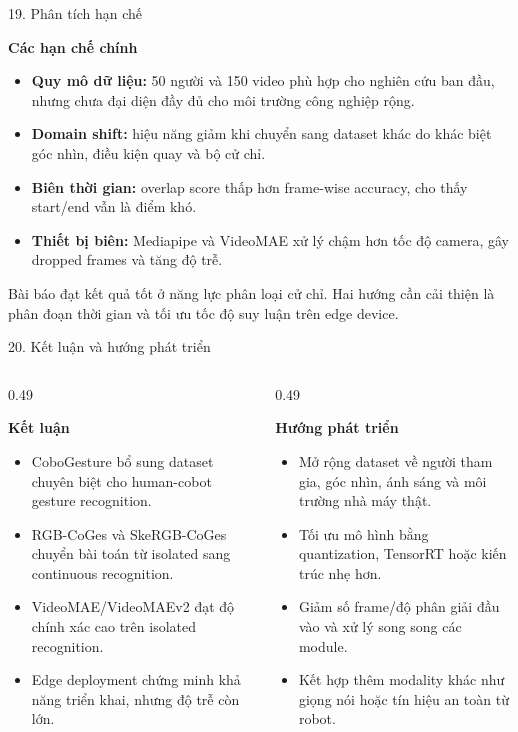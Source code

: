 \documentclass[aspectratio=169,9pt]{beamer}
\newcommand{\heading}[1]{{\bfseries #1\par}}
\newcommand{\tightitems}{\setlength{\itemsep}{0.12em}\setlength{\parskip}{0pt}\setlength{\parsep}{0pt}}
\begin{document}
\begin{frame}{19. Phân tích hạn chế}
  \vspace{0.02cm}
  \heading{Các hạn chế chính}
  \begin{itemize}\tightitems
    \item \textbf{Quy mô dữ liệu:} 50 người và 150 video phù hợp cho nghiên cứu ban đầu, nhưng chưa đại diện đầy đủ cho môi trường công nghiệp rộng.
    \item \textbf{Domain shift:} hiệu năng giảm khi chuyển sang dataset khác do khác biệt góc nhìn, điều kiện quay và bộ cử chỉ.
    \item \textbf{Biên thời gian:} overlap score thấp hơn frame-wise accuracy, cho thấy start/end vẫn là điểm khó.
    \item \textbf{Thiết bị biên:} Mediapipe và VideoMAE xử lý chậm hơn tốc độ camera, gây dropped frames và tăng độ trễ.
  \end{itemize}
  \vspace{0.20cm}
  \begin{tcolorbox}[redbox,title=Nhận định tổng hợp]
    Bài báo đạt kết quả tốt ở năng lực phân loại cử chỉ. Hai hướng cần cải thiện là phân đoạn thời gian và tối ưu tốc độ suy luận trên edge device.
  \end{tcolorbox}
\end{frame}

\begin{frame}{20. Kết luận và hướng phát triển}
  \vspace{0.05cm}
  \begin{columns}[T,onlytextwidth]
    \begin{column}{0.49\textwidth}
      \heading{Kết luận}
      \begin{itemize}\tightitems
        \item CoboGesture bổ sung dataset chuyên biệt cho human-cobot gesture recognition.
        \item RGB-CoGes và SkeRGB-CoGes chuyển bài toán từ isolated sang continuous recognition.
        \item VideoMAE/VideoMAEv2 đạt độ chính xác cao trên isolated recognition.
        \item Edge deployment chứng minh khả năng triển khai, nhưng độ trễ còn lớn.
      \end{itemize}
    \end{column}
    \begin{column}{0.49\textwidth}
      \heading{Hướng phát triển}
      \begin{itemize}\tightitems
        \item Mở rộng dataset về người tham gia, góc nhìn, ánh sáng và môi trường nhà máy thật.
        \item Tối ưu mô hình bằng quantization, TensorRT hoặc kiến trúc nhẹ hơn.
        \item Giảm số frame/độ phân giải đầu vào và xử lý song song các module.
        \item Kết hợp thêm modality khác như giọng nói hoặc tín hiệu an toàn từ robot.
      \end{itemize}
    \end{column}
  \end{columns}
\end{frame}
\end{document}
